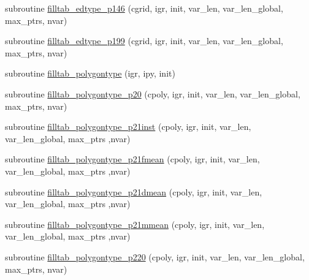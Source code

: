 \begin{DoxyCompactItemize}
\item 
subroutine \hyperlink{namespaceed__state__vars_a973191c14021cf533e4643205c6623d8}{filltab\+\_\+edtype\+\_\+p146} (cgrid, igr, init, var\+\_\+len, var\+\_\+len\+\_\+global, max\+\_\+ptrs, nvar)
\item 
subroutine \hyperlink{namespaceed__state__vars_a241cb06b937cbad37050f035e6305788}{filltab\+\_\+edtype\+\_\+p199} (cgrid, igr, init, var\+\_\+len, var\+\_\+len\+\_\+global, max\+\_\+ptrs, nvar)
\item 
subroutine \hyperlink{namespaceed__state__vars_a5059d40682c2653017de524077b8dae5}{filltab\+\_\+polygontype} (igr, ipy, init)
\item 
subroutine \hyperlink{namespaceed__state__vars_a246e5298a265c587bd0f78db320e29c5}{filltab\+\_\+polygontype\+\_\+p20} (cpoly, igr, init, var\+\_\+len, var\+\_\+len\+\_\+global, max\+\_\+ptrs, nvar)
\item 
subroutine \hyperlink{namespaceed__state__vars_a64d47c7d852aa23bca56c7de34683c9d}{filltab\+\_\+polygontype\+\_\+p21inst} (cpoly, igr, init, var\+\_\+len, var\+\_\+len\+\_\+global, max\+\_\+ptrs                                                                                                                                                                       ,nvar)
\item 
subroutine \hyperlink{namespaceed__state__vars_af19ecf7678627fccba6adcca82feb553}{filltab\+\_\+polygontype\+\_\+p21fmean} (cpoly, igr, init, var\+\_\+len, var\+\_\+len\+\_\+global, max\+\_\+ptrs                                                                                                                                                                   ,nvar)
\item 
subroutine \hyperlink{namespaceed__state__vars_ade2d35b3ad1ba1f23c8f0a694824064a}{filltab\+\_\+polygontype\+\_\+p21dmean} (cpoly, igr, init, var\+\_\+len, var\+\_\+len\+\_\+global, max\+\_\+ptrs                                                                                                                                                                   ,nvar)
\item 
subroutine \hyperlink{namespaceed__state__vars_a9c13af78d563782f9b8d4427488f73b8}{filltab\+\_\+polygontype\+\_\+p21mmean} (cpoly, igr, init, var\+\_\+len, var\+\_\+len\+\_\+global, max\+\_\+ptrs                                                                                                                                                                   ,nvar)
\item 
subroutine \hyperlink{namespaceed__state__vars_a7d921b75e21a0601c4dac488c4d1aa01}{filltab\+\_\+polygontype\+\_\+p220} (cpoly, igr, init, var\+\_\+len, var\+\_\+len\+\_\+global, max\+\_\+ptrs, nvar)

\end{DoxyCompactItemize}
